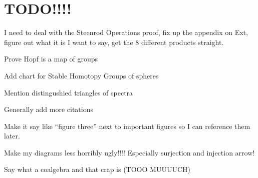 \section{TODO!!!!}



I need to deal with the Steenrod Operations proof, fix up the appendix on Ext, figure out what it is I want to say, get the 8 different products straight.  

Prove Hopf is a map of groups

Add chart for Stable Homotopy Groups of spheres

Mention distingushied triangles of spectra

Generally add more citations

Make it say like ``figure three'' next to important figures so I can reference them later.

Make my diagrams less horribly ugly!!!!  Especially surjection and injection arrow!

Say what a coalgebra and that crap is (TOOO MUUUUCH)
